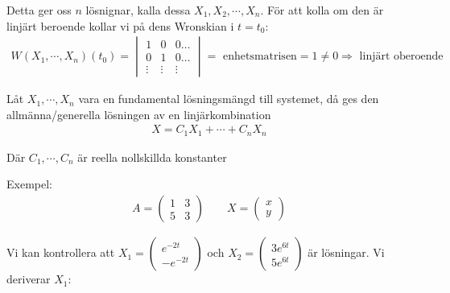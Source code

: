 \noindent Detta ger oss $n$ lösnignar, kalla dessa $X_1,X_2,\cdots, X_n$. För att kolla om den är linjärt beroende kollar vi på dens Wronskian i $t=t_0$:
\begin{equation*}
  \begin{gathered}
    W(X_1,\cdots, X_n)(t_0) = \begin{vmatrix}1&0&0\hdots\\0&1&0\hdots\\\vdots&\vdots&\vdots\end{vmatrix} = \text{ enhetsmatrisen} = 1\neq0 \Rightarrow \text{ linjärt oberoende}
  \end{gathered}
\end{equation*}
\par\bigskip
\begin{theo}
  Låt $X_1,\cdots, X_n$ vara en fundamental lösningsmängd till systemet, då ges den allmänna/generella lösningen av en linjärkombination
  \begin{equation*}
    \begin{gathered}
      X = C_1X_1+\cdots+C_nX_n
    \end{gathered}
  \end{equation*}\par
  \noindent Där $C_1,\cdots, C_n$ är reella nollskillda konstanter
\end{theo}
\par\bigskip
\noindent Exempel:
\begin{equation*}
  \begin{gathered}
    A = \begin{pmatrix}1&3\\5&3\end{pmatrix}\qquad X = \begin{pmatrix}x\\y\end{pmatrix}
  \end{gathered}
\end{equation*}\par
\noindent Vi kan kontrollera att $X_1 = \begin{pmatrix}e^{-2t}\\-e^{-2t}\end{pmatrix}$ och $X_2 = \begin{pmatrix}3e^{6t}\\5e^{6t}\end{pmatrix}$ är lösningar. Vi deriverar $X_1$:

